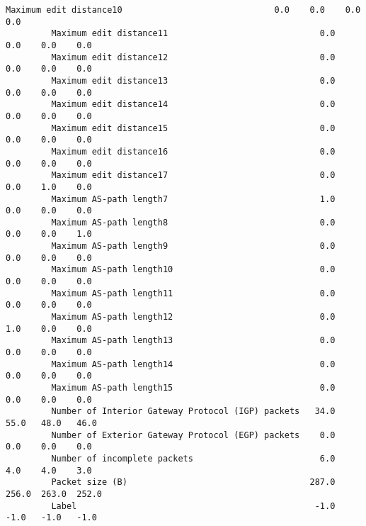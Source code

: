\documentclass[11pt]{article}
\begin{document}
\begin{Verbatim}[commandchars=\\\{\}]
         Maximum edit distance10                              0.0    0.0    0.0    0.0   
         Maximum edit distance11                              0.0    0.0    0.0    0.0   
         Maximum edit distance12                              0.0    0.0    0.0    0.0   
         Maximum edit distance13                              0.0    0.0    0.0    0.0   
         Maximum edit distance14                              0.0    0.0    0.0    0.0   
         Maximum edit distance15                              0.0    0.0    0.0    0.0   
         Maximum edit distance16                              0.0    0.0    0.0    0.0   
         Maximum edit distance17                              0.0    0.0    1.0    0.0   
         Maximum AS-path length7                              1.0    0.0    0.0    0.0   
         Maximum AS-path length8                              0.0    0.0    0.0    1.0   
         Maximum AS-path length9                              0.0    0.0    0.0    0.0   
         Maximum AS-path length10                             0.0    0.0    0.0    0.0   
         Maximum AS-path length11                             0.0    0.0    0.0    0.0   
         Maximum AS-path length12                             0.0    1.0    0.0    0.0   
         Maximum AS-path length13                             0.0    0.0    0.0    0.0   
         Maximum AS-path length14                             0.0    0.0    0.0    0.0   
         Maximum AS-path length15                             0.0    0.0    0.0    0.0   
         Number of Interior Gateway Protocol (IGP) packets   34.0   55.0   48.0   46.0   
         Number of Exterior Gateway Protocol (EGP) packets    0.0    0.0    0.0    0.0   
         Number of incomplete packets                         6.0    4.0    4.0    3.0   
         Packet size (B)                                    287.0  256.0  263.0  252.0   
         Label                                               -1.0   -1.0   -1.0   -1.0   
         

\end{Verbatim}
\end{document}
